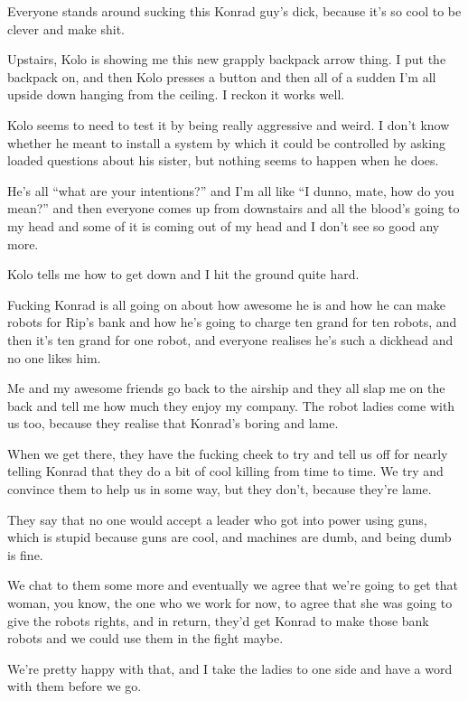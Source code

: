 Everyone stands around sucking this Konrad guy's dick, because it's so cool to be clever and make shit.\medskip

Upstairs, Kolo is showing me this new grapply backpack arrow thing. I put the backpack on, and then Kolo presses a button and then all of a sudden I'm all upside down hanging from the ceiling. I reckon it works well.\medskip

Kolo seems to need to test it by being really aggressive and weird. I don't know whether he meant to install a system by which it could be controlled by asking loaded questions about his sister, but nothing seems to happen when he does.\medskip

He's all ``what are your intentions?'' and I'm all like ``I dunno, mate, how do you mean?'' and then everyone comes up from downstairs and all the blood's going to my head and some of it is coming out of my head and I don't see so good any more.\medskip

Kolo tells me how to get down and I hit the ground quite hard.\medskip

Fucking Konrad is all going on about how awesome he is and how he can make robots for Rip's bank and how he's going to charge ten grand for ten robots, and then it's ten grand for one robot, and everyone realises he's such a dickhead and no one likes him.\medskip

Me and my awesome friends go back to the airship and they all slap me on the back and tell me how much they enjoy my company. The robot ladies come with us too, because they realise that Konrad's boring and lame.\medskip

When we get there, they have the fucking cheek to try and tell us off for nearly telling Konrad that they do a bit of cool killing from time to time. We try and convince them to help us in some way, but they don't, because they're lame.\medskip

They say that no one would accept a leader who got into power using guns, which is stupid because guns are cool, and machines are dumb, and being dumb is fine.\medskip

We chat to them some more and eventually we agree that we're going to get that woman, you know, the one who we work for now, to agree that she was going to give the robots rights, and in return, they'd get Konrad to make those bank robots and we could use them in the fight maybe.\medskip

We're pretty happy with that, and I take the ladies to one side and have a word with them before we go.\medskip

